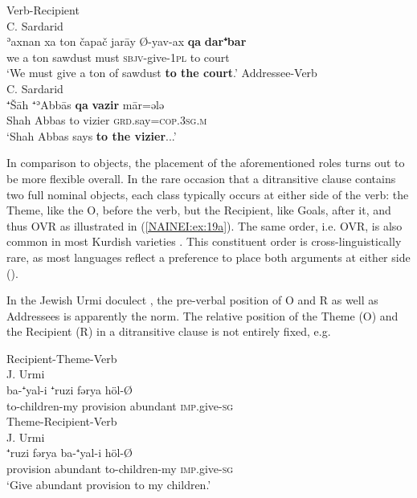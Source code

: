 \documentclass[output=paper,colorlinks,citecolor=brown,draftmode]{langscibook}
\begin{document}
\ea
\ea\label{NAINEI:ex:19a}
Verb-Recipient \\
C. Sardarid \citep[17:\S 10]{Younansardaroud2001Sardarid} \\
\gll ʾaxnan xa ton čapač jarāy Ø-yav-ax \textbf{qa} \textbf{dar⁺bar} \\
     we a ton sawdust must \textsc{sbjv-}give\textsc{-1pl} to court \\
\glt `We must give a ton of sawdust \textbf{to the court}.'
\ex\label{NAINEI:ex:19b}
Addressee-Verb \\
C. Sardarid \citep[15:\S 3]{Younansardaroud2001Sardarid} \\
\gll ⁺Šāh ⁺ʾAbbās \textbf{qa} \textbf{vazir} mār=ələ \\
     Shah Abbas to vizier \textsc{grd.}say\textsc{=cop.3sg.m} \\
\glt `Shah Abbas says \textbf{to the vizier}...'
\z
\z

In comparison to objects, the placement of the aforementioned  roles turns out to be more flexible overall. In the rare occasion that a ditransitive clause contains two full nominal objects, each  class typically occurs at either side of the verb: the Theme, like the O, before the verb, but the Recipient, like Goals, after it, and thus OVR as illustrated in (\ref{NAINEI:ex:19a}). The same order, i.e. OVR, is also common in most Kurdish varieties \parencite{Haig2022PostPredicateCon}. This constituent order is cross-linguistically rare, as most languages reflect a preference to place both arguments at either side (\citealt{Haspelmath2015Ditransitive}). 

In the Jewish Urmi doculect \parencite{Khan2008JUrmi}, the pre-verbal position of O and R as well as Addressees is apparently the norm. The relative position of the Theme (O) and the Recipient (R) in a ditransitive clause is not entirely fixed, e.g. 

\ea
\ea\label{NAINEI:ex:20a}
Recipient-Theme-Verb\\
J. Urmi \citep[\S 122]{Khan2008JUrmi} \\
\gll ba-⁺yal-i ⁺ruzi fərya höl-Ø \\
     to-children-my provision abundant \textsc{imp.}give\textsc{-sg} \\
\ex\label{NAINEI:ex:20b}
Theme-Recipient-Verb\\
J. Urmi \citep[\S 113]{Khan2008JUrmi} \\
\gll ⁺ruzi fərya ba-⁺yal-i höl-Ø \\
     provision abundant to-children-my \textsc{imp.}give\textsc{-sg} \\
\glt `Give abundant provision to my children.'
\z
\z
\end{document}
